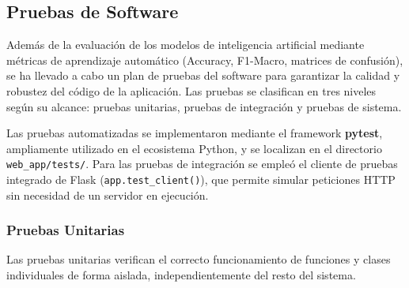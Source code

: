 
\subsection{Pruebas de Software}

Además de la evaluación de los modelos de inteligencia artificial mediante métricas de aprendizaje automático (Accuracy, F1-Macro, matrices de confusión), se ha llevado a cabo un plan de pruebas del software para garantizar la calidad y robustez del código de la aplicación. Las pruebas se clasifican en tres niveles según su alcance: pruebas unitarias, pruebas de integración y pruebas de sistema.

Las pruebas automatizadas se implementaron mediante el framework \textbf{pytest}, ampliamente utilizado en el ecosistema Python, y se localizan en el directorio \texttt{web\_app/tests/}. Para las pruebas de integración se empleó el cliente de pruebas integrado de Flask (\texttt{app.test\_client()}), que permite simular peticiones HTTP sin necesidad de un servidor en ejecución.

\subsubsection{Pruebas Unitarias}

Las pruebas unitarias verifican el correcto funcionamiento de funciones y clases individuales de forma aislada, independientemente del resto del sistema.

